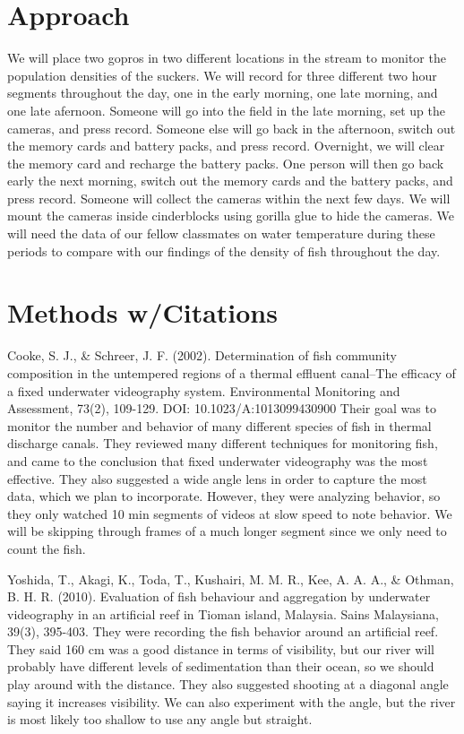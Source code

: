 \documentclass{tufte-handout}
\begin{document}
\section{Approach} We will place two gopros in two different locations in the stream to monitor the population densities of the suckers. We will record for three different two hour segments throughout the day, one in the early morning, one late morning, and one late afernoon.  Someone will go into the field in the late morning, set up the cameras, and press record.  Someone else will go back in the afternoon, switch out the memory cards and battery packs, and press record. Overnight, we will clear the memory card and recharge the battery packs.  One person will then go back early the next morning, switch out the memory cards and the battery packs, and press record.  Someone will collect the cameras within the next few days.  We will mount the cameras inside cinderblocks using gorilla glue to hide the cameras. We will need the data of our fellow classmates on water temperature during these periods to compare with our findings of the density of fish throughout the day.

 

\section{Methods w/Citations} Cooke, S. J., & Schreer, J. F. (2002). Determination of fish community composition in the untempered regions of a thermal effluent canal–The efficacy of a fixed underwater videography system. Environmental Monitoring and Assessment, 73(2), 109-129.  DOI: 10.1023/A:1013099430900
Their goal was to monitor the number and behavior of many different species of fish in thermal discharge canals.  They reviewed many different techniques for monitoring fish, and came to the conclusion that fixed underwater videography was the most effective.  They also suggested a wide angle lens in order to capture the most data, which we plan to incorporate.  However, they were analyzing behavior, so they only watched 10 min segments of videos at slow speed to note behavior.  We will be skipping through frames of a much longer segment since we only need to count the fish. 

Yoshida, T., Akagi, K., Toda, T., Kushairi, M. M. R., Kee, A. A. A., & Othman, B. H. R. (2010). Evaluation of fish behaviour and aggregation by underwater videography in an artificial reef in Tioman island, Malaysia. Sains Malaysiana, 39(3), 395-403.
They were recording the fish behavior around an artificial reef.  They said 160 cm was a good distance in terms of visibility, but our river will probably have different levels of sedimentation than their ocean, so we should play around with the distance.  They also suggested shooting at a diagonal angle saying it increases visibility.  We can also experiment with the angle, but the river is most likely too shallow to use any angle but straight.
\end{document}
